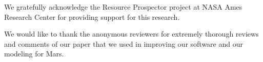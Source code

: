 \documentclass[draft,linenumbers]{agujournal}
\begin{document}
\acknowledgments

We gratefully acknowledge the Resource Prospector project at NASA Ames
Research Center for providing support for this research.

We would like to thank the anonymous reviewers for extremely thorough reviews and comments
of our paper \cite{alexandrovmulti} that we used in improving our software and our modeling for Mars. 










%
%
%
%
%
%
%
%
%
%








\end{document}
